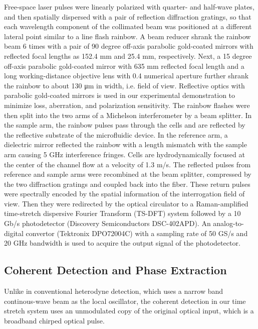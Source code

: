 \documentclass[aps,pra,reprint,superscriptaddress]{revtex4-1}
\begin{document}
Free-space laser pulses were linearly polarized with quarter- and half-wave plates, and then spatially dispersed with a pair of reflection diffraction gratings, so that each wavelength component of the collimated beam was positioned at a different lateral point similar to a line flash rainbow. A beam reducer shrank the rainbow beam 6 times with a pair of 90 degree off-axis parabolic gold-coated mirrors with reflected focal lengths as 152.4 mm and 25.4 mm, respectively. Next, a 15 degree off-axis parabolic gold-coated mirror with 635 mm reflected focal length and a long working-distance objective lens with 0.4 numerical aperture further shrank the rainbow to about 130 μm in width, i.e. field of view. Reflective optics with parabolic gold-coated mirrors is used in our experimental demonstration to minimize loss, aberration, and polarization sensitivity. The rainbow flashes were then split into the two arms of a Michelson interferometer by a beam splitter. In the sample arm, the rainbow pulses pass through the cells and are reflected by the reflective substrate of the microfluidic device. In the reference arm, a dielectric mirror reflected the rainbow with a length mismatch with the sample arm causing 5 GHz interference fringes. Cells are hydrodynamically focused at the center of the channel flow at a velocity of 1.3 m/s. The reflected pulses from reference and sample arms were recombined at the beam splitter, compressed by the two diffraction gratings and coupled back into the fiber. These return pulses were spectrally encoded by the spatial information of the interrogation field of view. Then they were redirected by the optical circulator to a Raman-amplified time-stretch dispersive Fourier Transform (TS-DFT) system followed by a 10 Gb/s photodetector (Discovery Semiconductors DSC-402APD). An analog-to-digital convertor (Tektronix DPO72004C) with a sampling rate of 50 GS/s and 20 GHz bandwidth is used to acquire the output signal of the photodetector.

\subsection{Coherent Detection and Phase Extraction}

Unlike in conventional heterodyne detection, which uses a narrow band continous-wave beam as the local oscillator, the coherent detection in our time stretch system uses an unmodulated copy of the original optical input, which is a broadband chirped optical pulse. 
\end{document}
